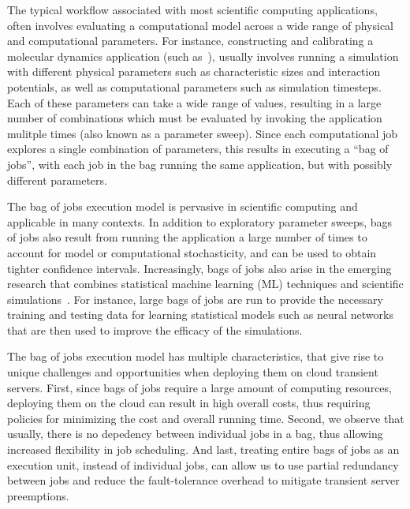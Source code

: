 The typical workflow associated with most scientific computing applications, often involves evaluating a computational model across a wide range of physical and computational parameters. 
For instance, constructing and calibrating a molecular dynamics application (such as~\cite{jcs2}), usually involves running a simulation with different physical parameters such as characteristic sizes and interaction potentials, as well as computational parameters such as simulation timesteps. 
Each of these parameters can take a wide range of values, resulting in a large number of combinations which must be evaluated by invoking the application mulitple times (also known as a parameter sweep). 
Since each computational job explores a single combination of parameters, this results in executing a ``bag of jobs'', with each job in the bag running the same application, but with possibly different parameters. 


The bag of jobs execution model is pervasive in scientific computing and applicable in many contexts.
In addition to exploratory parameter sweeps, bags of jobs also result from running the application a large number of times to account for model or computational stochasticity, and can be used to obtain tighter confidence intervals. 
Increasingly, bags of jobs also arise in the emerging research that combines statistical machine learning (ML) techniques and scientific simulations~\cite{ml.atomic2017,melko2017,sam2017,fu2017,long2015machine, ferguson2017machine,ward2018matminer,jcs2,fox2019learning}.
For instance, large bags of jobs are run to provide the necessary training and testing data for learning statistical models such as neural networks that are then used to improve the efficacy of the simulations. 



The bag of jobs execution model has multiple characteristics, that give rise to unique challenges and opportunities when deploying them on cloud transient servers. 
First, since bags of jobs require a large amount of computing resources, deploying them on the cloud can result in high overall costs, thus requiring policies for minimizing the cost and overall running time. 
Second, we observe that usually, there is no depedency between individual jobs in a bag, thus allowing increased flexibility in job scheduling.
And last, treating entire bags of jobs as an execution unit, instead of individual jobs, can allow us to use partial redundancy between jobs and reduce the fault-tolerance overhead to mitigate transient server preemptions. 







